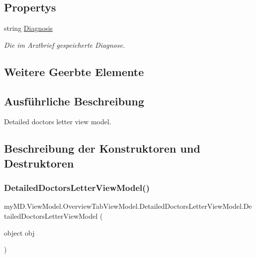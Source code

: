 \subsection*{Propertys}
\begin{DoxyCompactItemize}
\item 
string \mbox{\hyperlink{classmy_m_d_1_1_view_model_1_1_overview_tab_view_model_1_1_detailed_doctors_letter_view_model_a8a19eda5700386266c53ed6fb1f22a9c}{Diagnosis}}
\begin{DoxyCompactList}\small\item\em Die im Arztbrief gespeicherte Diagnose. \end{DoxyCompactList}\end{DoxyCompactItemize}
\subsection*{Weitere Geerbte Elemente}


\subsection{Ausführliche Beschreibung}
Detailed doctors letter view model. 



\subsection{Beschreibung der Konstruktoren und Destruktoren}
\mbox{\label{classmy_m_d_1_1_view_model_1_1_overview_tab_view_model_1_1_detailed_doctors_letter_view_model_a344adddfaaa08415feb4e37a8d2428f5}} 
\subsubsection{\texorpdfstring{Detailed\+Doctors\+Letter\+View\+Model()}{DetailedDoctorsLetterViewModel()}\hspace{0.1cm}{\footnotesize\ttfamily [1/2]}}
{\footnotesize\ttfamily my\+M\+D.\+View\+Model.\+Overview\+Tab\+View\+Model.\+Detailed\+Doctors\+Letter\+View\+Model.\+Detailed\+Doctors\+Letter\+View\+Model (\begin{DoxyParamCaption}\item[{object}]{obj }\end{DoxyParamCaption})}



